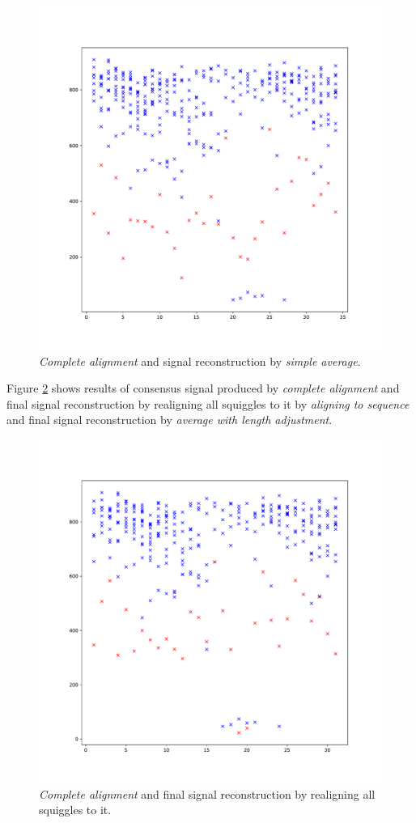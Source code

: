 \begin{figure}
  \centering
  \includegraphics[width=1.0\textwidth]{images/final4}
  \caption{\textit{Complete alignment} and signal reconstruction by \textit{simple average}.}
  \label{fig:final4}
\end{figure}

Figure \ref{fig:final5} shows results of consensus signal produced by \textit{complete alignment} and 
final signal reconstruction by realigning all squiggles to it by \textit{aligning to sequence} and
final signal reconstruction by \textit{average with length adjustment}. 

\begin{figure}
  \centering
  \includegraphics[width=1.0\textwidth]{images/final5}
  \caption{\textit{Complete alignment} and final signal reconstruction by realigning all squiggles to it.}
  \label{fig:final5}
\end{figure}